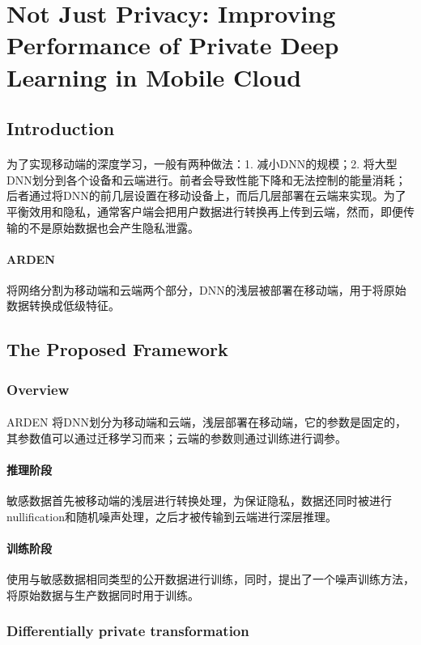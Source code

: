 \documentclass[12pt,a4paper]{article}
\begin{document}
\section{Not Just Privacy: Improving Performance of Private Deep Learning in Mobile Cloud\cite{arden}}
\subsection{Introduction}
\paragraph{} 为了实现移动端的深度学习，一般有两种做法：1. 减小DNN的规模；2. 将大型DNN划分到各个设备和云端进行。前者会导致性能下降和无法控制的能量消耗；后者通过将DNN的前几层设置在移动设备上，而后几层部署在云端来实现。为了平衡效用和隐私，通常客户端会把用户数据进行转换再上传到云端，然而，即便传输的不是原始数据也会产生隐私泄露。
\paragraph{ARDEN} 将网络分割为移动端和云端两个部分，DNN的浅层被部署在移动端，用于将原始数据转换成低级特征。

\subsection{The Proposed Framework}
\subsubsection{Overview}
\paragraph{} ARDEN 将DNN划分为移动端和云端，浅层部署在移动端，它的参数是固定的，其参数值可以通过迁移学习而来；云端的参数则通过训练进行调参。
\paragraph{推理阶段} 敏感数据首先被移动端的浅层进行转换处理，为保证隐私，数据还同时被进行nullification和随机噪声处理，之后才被传输到云端进行深层推理。
\paragraph{训练阶段} 使用与敏感数据相同类型的公开数据进行训练，同时，提出了一个噪声训练方法，将原始数据与生产数据同时用于训练。
\subsubsection{Differentially private transformation}
\end{document}
